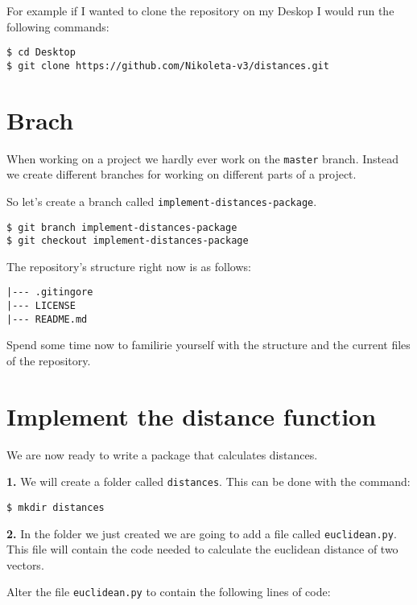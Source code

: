 \documentclass[11pt]{article}
\begin{document}
For example if I wanted to clone the repository on my Deskop I would run
the following commands:

\begin{verbatim}
$ cd Desktop
$ git clone https://github.com/Nikoleta-v3/distances.git
\end{verbatim}

    \hypertarget{brach}{%
\section{Brach}\label{brach}}

When working on a project we hardly ever work on the \texttt{master}
branch. Instead we create different branches for working on different
parts of a project.

So let's create a branch called \texttt{implement-distances-package}.

\begin{verbatim}
$ git branch implement-distances-package
$ git checkout implement-distances-package
\end{verbatim}

    The repository's structure right now is as follows:

\begin{verbatim}
|--- .gitingore
|--- LICENSE   
|--- README.md
\end{verbatim}

Spend some time now to familirie yourself with the structure and the
current files of the repository.

    \hypertarget{implement-the-distance-function}{%
\section{Implement the distance
function}\label{implement-the-distance-function}}

We are now ready to write a package that calculates distances.

\textbf{1.} We will create a folder called \texttt{distances}. This can
be done with the command:

\begin{verbatim}
$ mkdir distances
\end{verbatim}

\textbf{2.} In the folder we just created we are going to add a file
called \texttt{euclidean.py}. This file will contain the code needed to
calculate the euclidean distance of two vectors.

Alter the file \texttt{euclidean.py} to contain the following lines of
code:
\end{document}
